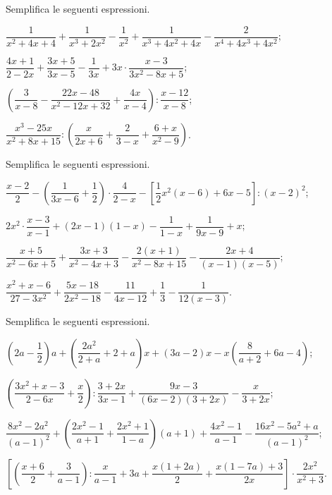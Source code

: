 \begin{esercizio}[\Ast]
Semplifica le seguenti espressioni.
\begin{enumeratea}
 \item $\dfrac{1}{x^{2}+4x+4}+\dfrac{1}{x^{3}+2x^{2}}-\dfrac{1}{x^{2}}+\dfrac{1}{x^{3}+4x^{2}+4x}-\dfrac{2}{x^{4}+4x^{3}+4x^{2}}$;
 \item $\dfrac{4x+1}{2-2x}+\dfrac{3x+5}{3x-5}-\dfrac{1}{3x}+3x\cdot {\dfrac{x-3}{3x^{2}-8x+5}}$;
 \item $\left(\dfrac{3}{x-8}-\dfrac{22x-48}{x^{2}-12x+32}+\dfrac{4x}{x-4}\right):\dfrac{x-12}{x-8}$;
 \item $\dfrac{x^{{3}}-25x}{x^{{2}}+8x+15}:\left(\dfrac{x}{2x+6}+\dfrac{2}{3-x}+\dfrac{6+x}{x^{{2}}-9}\right)$.
\end{enumeratea}
\end{esercizio}

\begin{esercizio}[\Ast]
Semplifica le seguenti espressioni.
\begin{enumeratea}
 \item $\dfrac{x-2}{2}-\left(\dfrac{1}{3x-6}+\dfrac{1}{2}\right)\cdot {\dfrac{4}{2-x}}-\left[\dfrac{1}{2}x^{2}(x-6)+6x-5\right]:(x-2)^{2}$;
 \item $2x^{2}\cdot {\dfrac{x-3}{x-1}}+(2x-1)(1-x)-\dfrac{1}{1-x}+\dfrac{1}{9x-9}+x$;
 \item $\dfrac{x+5}{x^{2}-6x+5}+\dfrac{3x+3}{x^{2}-4x+3}-\dfrac{2(x+1)}{x^{2}-8x+15}-\dfrac{2x+4}{(x-1)(x-5)}$;
 \item $\dfrac{x^{2}+x-6}{27-3x^{2}}+\dfrac{5x-18}{2x^{2}-18}-\dfrac{11}{4x-12}+\dfrac{1}{3}-\dfrac{1}{12(x-3)}$.
\end{enumeratea}
\end{esercizio}

\begin{esercizio}[\Ast]
Semplifica le seguenti espressioni.
\begin{enumeratea}
 \item $\left(2a-\dfrac{1}{2}\right)a+\left(\dfrac{2a^{2}}{2+a}+2+a\right)x+(3a-2)x-x\left(\dfrac{8}{a+2}+6a-4\right)$;
 \item $\left(\dfrac{3x^{2}+x-3}{2-6x}+\dfrac{x}{2}\right):\dfrac{3+2x}{3x-1}+\dfrac{9x-3}{(6x-2)(3+2x)}-\dfrac{x}{3+2x}$;
 \item $\dfrac{8x^{2}-2a^{2}}{(a-1)^{2}}+\left(\dfrac{2x^{2}-1}{a+1}+\dfrac{2x^{2}+1}{1-a}\right)(a+1)+\dfrac{4x^{2}-1}{a-1}-\dfrac{16x^{2}-5a^{2}+a}{(a-1)^{2}}$;
 \item $\left[\left(\dfrac{x+6}{2}+\dfrac{3}{a-1}\right):\dfrac{x}{a-1}+3a+\dfrac{x(1+2a)}{2}+\dfrac{x(1-7a)+3}{2x}\right]\cdot {\dfrac{2x^{2}}{x^{2}+3}}$.
\end{enumeratea}
\end{esercizio}

